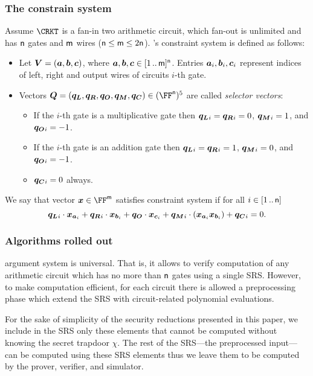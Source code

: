\documentclass[runningheads,11pt]{llncs}
\begin{document}
\subsubsection{The constrain system}
Assume $\CRKT$ is a fan-in two arithmetic circuit,
which fan-out is unlimited and has $\mathsf{n}$ gates and $\mathsf{m}$ wires
($\mathsf{n} \leq \mathsf{m} \leq 2\mathsf{n}$). \plonk's constraint
system is defined as follows:
\begin{itemize}
\item Let $\vec{V} = (\va, \vb, \vc)$, where $\va, \vb, \vc
  \in \range{1}{\noofw}^\numberofconstrains$. Entries $\va_i, \vb_i, \vc_i$ represent indices of left,
  right and output wires of circuits $i$-th gate.
\item Vectors $\vec{Q} = (\vql, \vqr, \vqo, \vqm, \vqc) \in
  (\FF^\numberofconstrains)^5$ are called \emph{selector vectors}:
  \begin{itemize}
  \item If the $i$-th gate is a multiplicative gate then $\vql_i = \vqr_i = 0$,
    $\vqm_i = 1$, and $\vqo_i = -1$. 
  \item If the $i$-th gate is an addition gate then $\vql_i = \vqr_i  = 1$, $\vqm_i =
    0$, and $\vqo_i = -1$. 
  \item $\vqc_i = 0$ always. 
  \end{itemize}
\end{itemize}

We say that vector $\vx \in \FF^\noofw$ satisfies constraint system if for all $i
\in [1 \, .. \, \mathsf{n}]$
\[
  \vql_i \cdot \vx_{\va_i} + \vqr_i \cdot \vx_{\vb_i} + \vqo \cdot \vx_{\vc_i} +
  \vqm_i \cdot (\vx_{\va_i} \vx_{\vb_i}) + \vqc_i = 0. 
\]

\subsubsection{Algorithms rolled out}
\label{sec:plonk_explained}
\plonk{} argument system is universal. That is, it allows to verify computation
of any arithmetic circuit which has no more than $\mathsf{n}$
gates using a single SRS. However, to make computation efficient, for each
circuit there is allowed a preprocessing phase which extend the SRS with
circuit-related polynomial evaluations.

For the sake of simplicity of the security reductions presented in this paper, we
include in the SRS only these elements that cannot be computed without knowing
the secret trapdoor $\chi$. The rest of the SRS---the preprocessed input---can
be computed using these SRS elements thus we leave them to be computed by the
prover, verifier, and simulator.
\end{document}
